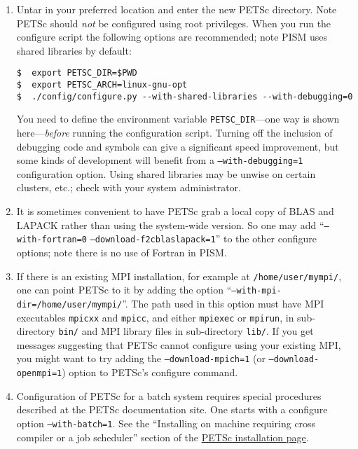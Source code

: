 \documentclass[titlepage,letterpaper,final]{scrartcl}
\begin{document}
\renewcommand{\labelenumi}{(\roman{enumi})}
\begin{enumerate}
\item Untar in your preferred location and enter the new PETSc directory.
  Note PETSc should \emph{not} be configured using root privileges.
  When you run the configure script the following
  options are recommended; note PISM uses shared libraries by
  default:
\begin{verbatim}
$  export PETSC_DIR=$PWD
$  export PETSC_ARCH=linux-gnu-opt
$  ./config/configure.py --with-shared-libraries --with-debugging=0
\end{verbatim}

You need to define the environment variable \texttt{PETSC_DIR}---one
way is shown here---\emph{before} running the configuration script.  Turning off the
inclusion of debugging code and symbols can give a significant speed improvement,
but some kinds of development will benefit from a \texttt{--with-debugging=1}
configuration option.  Using shared libraries may be unwise on certain clusters,
etc.; check with your system administrator.

\item It is sometimes convenient to have PETSc grab a local copy of BLAS and LAPACK rather than using the system-wide version.  So one may add ``\texttt{--with-fortran=0} \texttt{--download-f2cblaslapack=1}'' to the other configure options; note there is no use of Fortran in PISM.

\item If there is an existing MPI installation, for example at \texttt{/home/user/mympi/}, one can point PETSc to it by adding the option ``\texttt{--with-mpi-dir=/home/user/mympi/}''.  The path used in this option must have MPI executables \texttt{mpicxx} and \texttt{mpicc}, and either \texttt{mpiexec} or \texttt{mpirun}, in sub-directory \texttt{bin/} and MPI library files in sub-directory \texttt{lib/}. If you get messages suggesting that PETSc cannot configure using your existing MPI, you might want to try adding the \texttt{--download-mpich=1} (or \texttt{--download-openmpi=1}) option to PETSc's configure command.

\item Configuration of PETSc for a batch system requires special procedures described at the PETSc documentation site.  One starts with a configure option \texttt{--with-batch=1}.  See the ``Installing on machine requiring cross compiler or a job scheduler'' section of the \href{http://www-unix.mcs.anl.gov/petsc/petsc-2/documentation/installation.html}{PETSc installation page}.


\end{enumerate}
\end{document}
